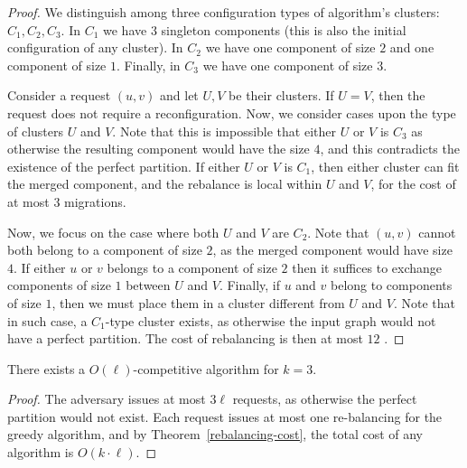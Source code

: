 \begin{proof} 
  
  We distinguish among three configuration types of algorithm's clusters: $C_1, C_2, C_3$. In $C_1$ we have $3$ singleton components (this is also the initial configuration of any cluster). In $C_2$ we have one component of size $2$ and one component of size $1$. Finally, in $C_3$ we have one component of size $3$.

  Consider a request $(u, v)$ and let $U, V$ be their clusters.
  If $U=V$, then the request does not require a reconfiguration.
  Now, we consider cases upon the type of clusters $U$ and $V$.
  Note that this is impossible that either $U$ or $V$ is $C_3$ as otherwise the resulting component would have the size $4$, and this contradicts the existence of the perfect partition.
  If either $U$ or $V$ is $C_1$, then either cluster can fit the merged component, and the rebalance is local within $U$ and $V$, for the cost of at most $3$ migrations.

  Now, we focus on the case where both $U$ and $V$ are $C_2$. Note that $(u,v)$ cannot both belong to a component of size $2$, as the merged component would have size $4$.
  If either $u$ or $v$ belongs to a component of size $2$ then it suffices to exchange components of size $1$ between $U$ and $V$.
  Finally, if $u$ and $v$ belong to components of size $1$, then we must place them in a cluster different from $U$ and $V$.
  Note that in such case, a $C_1$-type cluster exists, as otherwise the input graph would not have a perfect partition. The cost of rebalancing is then at most $12$ .
\end{proof}

\begin{theorem}
  There exists a $O(\ell)$-competitive algorithm for $k=3$.
\end{theorem}

\begin{proof}
  The adversary issues at most $3\ell$ requests, as otherwise the perfect partition would not exist. Each request issues at most one re-balancing for the greedy algorithm, and by Theorem~\ref{rebalancing-cost}, the total cost of any algorithm is $O(k\cdot \ell)$.
\end{proof}

